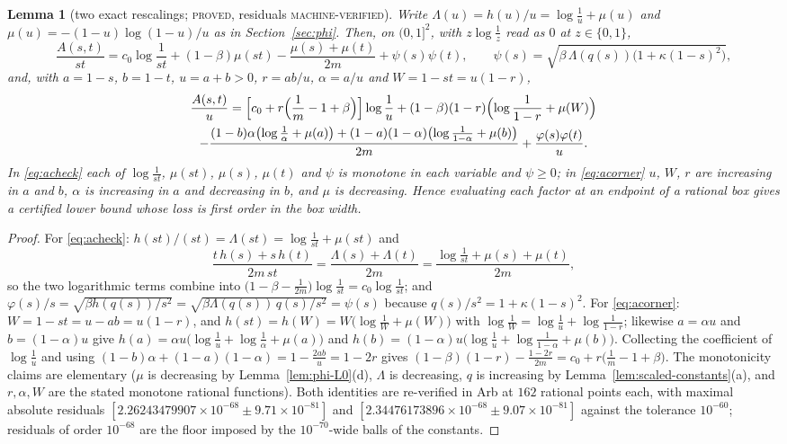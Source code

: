 \documentclass[11pt]{article}
\theoremstyle{plain}
\newtheorem{lemma}[theorem]{Lemma}
\theoremstyle{definition}
\theoremstyle{remark}
\newcommand{\lbl}[1]{\textsc{#1}}
\begin{document}
\begin{lemma}[two exact rescalings; \lbl{proved}, residuals \lbl{machine-verified}]\label{lem:rescale}
Write $\Lambda(u)=h(u)/u=\log\frac1u+\mu(u)$ and
$\mu(u)=-(1-u)\log(1-u)/u$ as in Section~\ref{sec:phi}.  Then, on $(0,1]^2$,
with $z\log\frac1z$ read as $0$ at $z\in\{0,1\}$,
\begin{equation}\label{eq:acheck}
  \frac{A(s,t)}{st}=c_0\log\frac1{st}+(1-\beta)\mu(st)-\frac{\mu(s)+\mu(t)}{2m}
  +\psi(s)\psi(t),\qquad
  \psi(s)=\sqrt{\beta\,\Lambda(q(s))\bigl(1+\kappa(1-s)^2\bigr)},
\end{equation}
and, with $a=1-s$, $b=1-t$, $u=a+b>0$, $r=ab/u$, $\alpha=a/u$ and
$W=1-st=u(1-r)$,
\begin{multline}\label{eq:acorner}
  \frac{A(s,t)}{u}=\Bigl[c_0+r\Bigl(\frac1m-1+\beta\Bigr)\Bigr]\log\frac1u
  +(1-\beta)(1-r)\Bigl(\log\frac1{1-r}+\mu(W)\Bigr)\\
  -\frac{(1-b)\alpha\bigl(\log\frac1\alpha+\mu(a)\bigr)
  +(1-a)(1-\alpha)\bigl(\log\frac1{1-\alpha}+\mu(b)\bigr)}{2m}
  +\frac{\varphi(s)\varphi(t)}{u}.
\end{multline}
In \eqref{eq:acheck} each of $\log\frac1{st}$, $\mu(st)$, $\mu(s)$, $\mu(t)$
and $\psi$ is monotone in each variable and $\psi\ge0$; in
\eqref{eq:acorner} $u$, $W$, $r$ are increasing in $a$ and $b$, $\alpha$ is
increasing in $a$ and decreasing in $b$, and $\mu$ is decreasing.  Hence
evaluating each factor at an endpoint of a rational box gives a certified
lower bound whose loss is first order in the box width.
\end{lemma}
\begin{proof}
For \eqref{eq:acheck}: $h(st)/(st)=\Lambda(st)=\log\frac1{st}+\mu(st)$ and
\[
  \frac{t\,h(s)+s\,h(t)}{2m\,st}=\frac{\Lambda(s)+\Lambda(t)}{2m}
  =\frac{\log\frac1{st}+\mu(s)+\mu(t)}{2m},
\]
so the two logarithmic terms combine into
$\bigl(1-\beta-\tfrac1{2m}\bigr)\log\frac1{st}=c_0\log\frac1{st}$; and
$\varphi(s)/s=\sqrt{\beta h(q(s))/s^2}=\sqrt{\beta\Lambda(q(s))\,q(s)/s^2}=\psi(s)$
because $q(s)/s^2=1+\kappa(1-s)^2$.  For \eqref{eq:acorner}: $W=1-st=u-ab=u(1-r)$,
and $h(st)=h(W)=W\bigl(\log\frac1W+\mu(W)\bigr)$ with
$\log\frac1W=\log\frac1u+\log\frac1{1-r}$; likewise $a=\alpha u$ and
$b=(1-\alpha)u$ give $h(a)=\alpha u\bigl(\log\frac1u+\log\frac1\alpha+\mu(a)\bigr)$
and $h(b)=(1-\alpha)u\bigl(\log\frac1u+\log\frac1{1-\alpha}+\mu(b)\bigr)$.
Collecting the coefficient of $\log\frac1u$ and using
$(1-b)\alpha+(1-a)(1-\alpha)=1-\frac{2ab}u=1-2r$ gives
$(1-\beta)(1-r)-\frac{1-2r}{2m}=c_0+r\bigl(\frac1m-1+\beta\bigr)$.  The
monotonicity claims are elementary ($\mu$ is decreasing by
Lemma~\ref{lem:phi-L0}(d), $\Lambda$ is decreasing, $q$ is increasing by
Lemma~\ref{lem:scaled-constants}(a), and $r,\alpha,W$ are the stated
monotone rational functions).  Both identities are re-verified in Arb at
$162$ rational points each, with maximal absolute residuals
$[2.26243479907\times10^{-68}\pm9.71\times10^{-81}]$ and
$[2.34476173896\times10^{-68}\pm9.07\times10^{-81}]$ against the tolerance
$10^{-60}$; residuals of order $10^{-68}$ are the floor imposed by the
$10^{-70}$-wide balls of the constants.
\end{proof}
\end{document}
